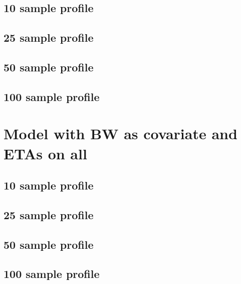 \subsection{10 sample profile}

\subsection{25 sample profile}

\subsection{50 sample profile}

\subsection{100 sample profile}


\section{Model with BW as covariate and ETAs on all}
\subsection{10 sample profile}

\subsection{25 sample profile}

\subsection{50 sample profile}

\subsection{100 sample profile}
